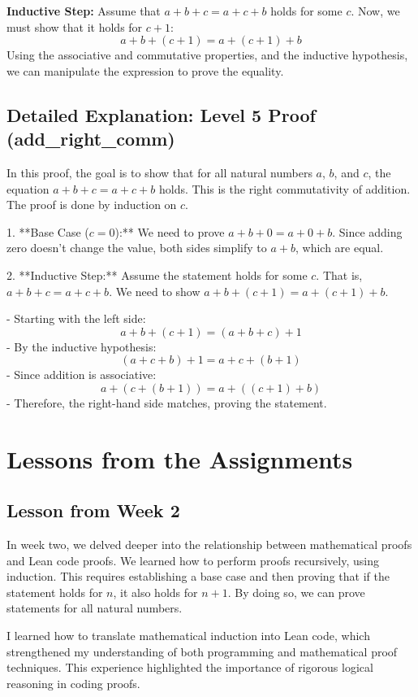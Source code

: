 \documentclass{article}
\begin{document}
\textbf{Inductive Step:} Assume that \(a + b + c = a + c + b\) holds for some \(c\). Now, we must show that it holds for \(c + 1\):
\[
a + b + (c + 1) = a + (c + 1) + b
\]
Using the associative and commutative properties, and the inductive hypothesis, we can manipulate the expression to prove the equality.

\subsection*{Detailed Explanation: Level 5 Proof (add\_right\_comm)}
In this proof, the goal is to show that for all natural numbers \(a\), \(b\), and \(c\), the equation \(a + b + c = a + c + b\) holds. This is the right commutativity of addition. The proof is done by induction on \(c\).

1. **Base Case (\(c = 0\)):** We need to prove \(a + b + 0 = a + 0 + b\). Since adding zero doesn't change the value, both sides simplify to \(a + b\), which are equal.

2. **Inductive Step:** Assume the statement holds for some \(c\). That is, \(a + b + c = a + c + b\). We need to show \(a + b + (c + 1) = a + (c + 1) + b\).

   - Starting with the left side:
     \[
     a + b + (c + 1) = (a + b + c) + 1
     \]
   - By the inductive hypothesis:
     \[
     (a + c + b) + 1 = a + c + (b + 1)
     \]
   - Since addition is associative:
     \[
     a + (c + (b + 1)) = a + ((c + 1) + b)
     \]
   - Therefore, the right-hand side matches, proving the statement.

\section*{Lessons from the Assignments}
\subsection*{Lesson from Week 2}
In week two, we delved deeper into the relationship between mathematical proofs and Lean code proofs. We learned how to perform proofs recursively, using induction. This requires establishing a base case and then proving that if the statement holds for \(n\), it also holds for \(n + 1\). By doing so, we can prove statements for all natural numbers.

I learned how to translate mathematical induction into Lean code, which strengthened my understanding of both programming and mathematical proof techniques. This experience highlighted the importance of rigorous logical reasoning in coding proofs.
\end{document}
